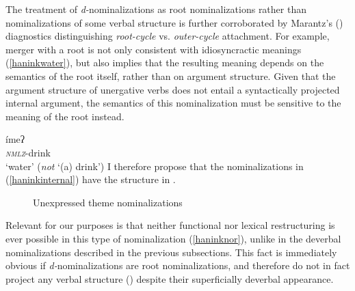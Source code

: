 \documentclass[output=paper]{langscibook}
\begin{document}
\ea 
{}
\label{haninkdenoted}
\z
\z

\begin{sloppypar}
The treatment of {\itshape d-}nominalizations as root nominalizations rather than nominalizations of some verbal structure is further corroborated by Marantz's (\citeyear{marantz2001}) diagnostics distinguishing {\itshape root-cycle} vs. {\itshape outer-cycle} attachment. For example, merger with a root is not only consistent with idiosyncractic meanings (\ref{haninkwater}), but also implies that the resulting meaning depends on the semantics of the root itself, rather than on argument structure. Given that the argument structure of unergative verbs does not entail a syntactically projected internal argument, the semantics of this nominalization must be sensitive to the meaning of the root instead. 
\end{sloppypar}

\ea {}ímeʔ\\
\textit{\textsc{nmlz}}-drink\\
\glt `water' ({\itshape not} `(a) drink') \label{haninkwater}
\z
I therefore propose that the nominalizations in (\ref{haninkinternal}) have the structure in .

\begin{figure}
\caption{\label{haninkdstructure}Unexpressed theme nominalizations}
 \end{figure}
 
Relevant for our purposes is that neither functional nor lexical restructuring is ever possible in this type of nominalization (\ref{haninknor}), unlike in the deverbal nominalizations described in the previous subsections.  This fact is immediately obvious if  {\itshape d-}nominalizations are root nominalizations, and therefore do not in fact project any verbal structure () despite their superficially deverbal appearance.
\end{document}
